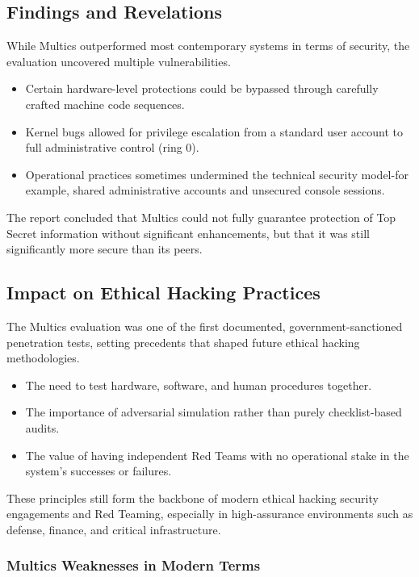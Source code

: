 \subsection{Findings and Revelations}
While Multics outperformed most contemporary systems in terms of security, the evaluation uncovered multiple vulnerabilities.
\begin{itemize}
    \item Certain hardware-level protections could be bypassed through carefully crafted machine code sequences.
    \item Kernel bugs allowed for privilege escalation from a standard user account to full administrative control (ring 0).
    \item Operational practices sometimes undermined the technical security model-for example, shared administrative accounts and unsecured console sessions.
\end{itemize}

The report concluded that Multics could not fully guarantee protection of Top Secret information without significant enhancements, but that it was still significantly more secure than its peers.

\subsection{Impact on Ethical Hacking Practices}
The Multics evaluation was one of the first documented, government-sanctioned penetration tests, setting precedents that shaped future ethical hacking methodologies.
\begin{itemize}
    \item The need to test hardware, software, and human procedures together.
    \item The importance of adversarial simulation rather than purely checklist-based audits.
    \item The value of having independent Red Teams with no operational stake in the system's successes or failures.
\end{itemize}

These principles still form the backbone of modern ethical hacking security engagements and Red Teaming, especially in high-assurance environments such as defense, finance, and critical infrastructure.

\subsubsection{Multics Weaknesses in Modern Terms}

